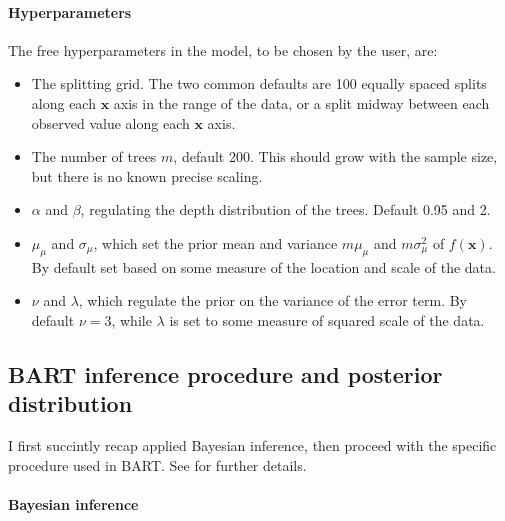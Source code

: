 \documentclass{article}
\begin{document}
    \paragraph{Hyperparameters}
    
    The free hyperparameters in the model, to be chosen by the user, are:
    \begin{itemize}

        \item The splitting grid. The two common defaults are 100 equally spaced splits along each $\mathbf x$ axis in the range of the data, or a split midway between each observed value along each $\mathbf x$ axis.
        
        \item The number of trees $m$, default 200. This should grow with the sample size, but there is no known precise scaling.
        
        \item $\alpha$ and $\beta$, regulating the depth distribution of the
        trees. Default 0.95 and 2.
        
        \item $\mu_\mu$ and $\sigma_\mu$, which set the prior mean and variance
        $m\mu_\mu$ and $m\sigma_\mu^2$ of $f(\mathbf x)$. By default set based on some measure of the location and scale of the data.
        
        \item $\nu$ and $\lambda$, which regulate the prior on the variance of the error term. By default $\nu=3$, while $\lambda$ is set to some measure of squared scale of the data.

    \end{itemize}

    \subsection{BART inference procedure and posterior distribution}

    I first succintly recap applied Bayesian inference, then proceed with the specific procedure used in BART. See \textcites{chipman1998,chipman2010}[\S A]{kapelner2016}[ch.~5]{daniels2023}[\S2.1.4, p.~5]{tan2019} for further details.

    \paragraph{Bayesian inference}
\end{document}
